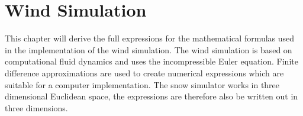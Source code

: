 \chapter{Wind Simulation}

This chapter will derive the full expressions for the mathematical formulas 
used in the implementation of the wind simulation. The wind simulation is 
based on computational fluid dynamics and uses the incompressible Euler 
equation. Finite difference approximations are used to create numerical 
expressions which are suitable for a computer implementation. The snow simulator 
works in three dimensional Euclidean space, the expressions are therefore also be 
written out in three dimensions. 

